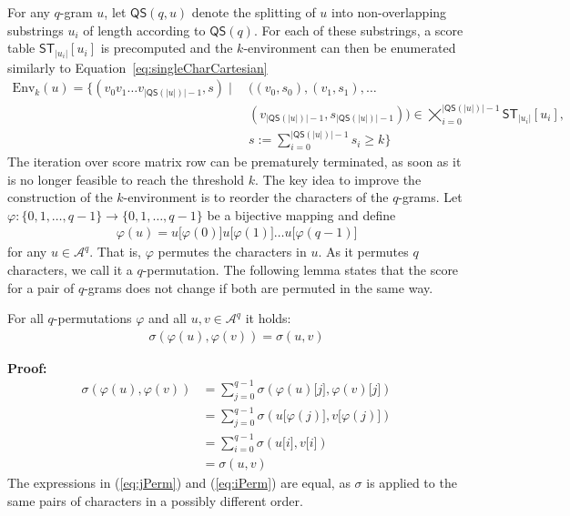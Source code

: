\documentclass[twoside,a4paper,bsc]{master}
\newcommand{\Subchar}[2]{#1\lbrack #2\rbrack}
\newcommand{\Scoretablename}[0]{\mathsf{ST}}
\newcommand{\Scoretable}[2]{\Scoretablename_{#1}[#2]}
\newcommand{\Alpha}[0]{\mathcal{A}}
\newcommand{\Qsplit}{\mathsf{QS}}
\newcommand{\Skiptheorem}{\smallskipamount}
\newcommand{\StartFormal}[1]{\par\addvspace{\Skiptheorem}\noindent\textbf{#1}}
\newcommand{\EndFormal}{\par\addvspace{\Skiptheorem}}
\newenvironment{Proof}{\StartFormal{Proof:}}{\EndFormal}
\begin{document}
For any \(q\)-gram \(u\),
let \(\Qsplit(q,u)\) denote the splitting of \(u\) into non-overlapping
substrings \(u_{i}\) of length according to \(\Qsplit(q)\).
For each of these substrings, a score table \(\Scoretable{|u_{i}|}{u_i}\)
is
precomputed and the \(k\)-environment can then be enumerated similarly to
Equation~\ref{eq:singleCharCartesian}
\begin{align}
\text{Env}_k(u) = \{(v_{0}v_{1}\ldots v_{|\Qsplit(|u|)|-1},s) \mid
& ~((v_{0},s_{0}),(v_{1},s_{1}),\ldots \nonumber\\
& ~(v_{|\Qsplit(|u|)|-1},s_{|\Qsplit(|u|)|-1}))\in
\bigtimes\nolimits_{i=0}^{|\Qsplit(|u|)|-1}\Scoretable{|u_i|}{u_i},\nonumber\\
& ~s:=\sum\nolimits_{i=0}^{|\Qsplit(|u|)|-1}s_{i}\geq
k\}\label{ScoreTablesCartesian}
\end{align}
The iteration over score matrix row can be prematurely terminated, as soon
as it is no longer feasible to reach the threshold \(k\).
The key idea to improve the construction of the \(k\)-environment
is to reorder the characters of the \(q\)-grams. Let
\(\varphi:\{0,1,\ldots,q-1\}\to\{0,1,\ldots,q-1\}\) be a bijective mapping
and define
\begin{align}
\varphi(u)=\Subchar{u}{\varphi(0)}\Subchar{u}{\varphi(1)}\ldots\Subchar{u}{\varphi(q-1)}
\end{align}
for any \(u\in\Alpha^{q}\). That is, \(\varphi\) permutes the
characters in \(u\). As it permutes \(q\) characters, we call it a
\(q\)-permutation. The following lemma
states that the score for a pair of \(q\)-grams does not change if both are
permuted in the same way.
\begin{Lemma}
\label{permutationProof}
For all \(q\)-permutations \(\varphi\) and all \(u,v\in\Alpha^{q}\) it
holds:
\begin{align}
\sigma(\varphi(u),\varphi(v))=\sigma(u,v)
\end{align}
\begin{Proof}
\begin{align}
\sigma(\varphi(u),\varphi(v))
&= \sum_{j=0}^{q-1} \sigma (\Subchar{\varphi(u)}{j},
\Subchar{\varphi(v)}{j})\\
&= \sum_{j=0}^{q-1} \sigma
(\Subchar{u}{\varphi(j)},\Subchar{v}{\varphi(j)})\label{eq:jPerm}\\
&= \sum_{i=0}^{q-1} \sigma
(\Subchar{u}{i},\Subchar{v}{i})\label{eq:iPerm}\\
&= \sigma(u,v)
\end{align}
The expressions in (\ref{eq:jPerm}) and (\ref{eq:iPerm}) are equal,
as \(\sigma\) is applied to the same pairs of characters in
a possibly different order.
\end{Proof}
\end{Lemma}
\end{document}
